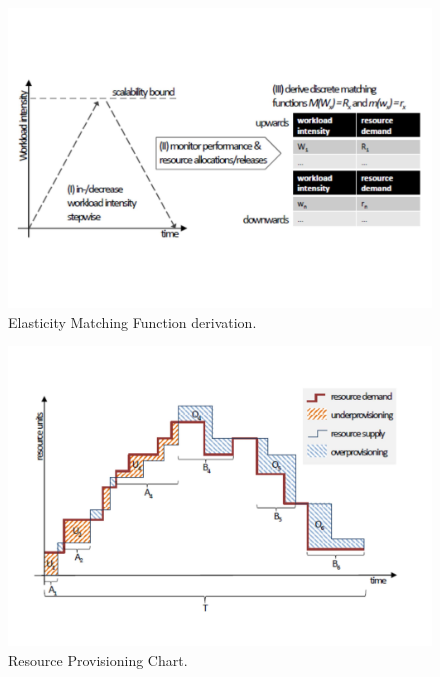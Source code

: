 \begin{figure}
	\vspace{-1.5cm}
	\centering
	\includegraphics[width=\columnwidth]{Images/elasticity_matching_function.pdf}
	\vspace{-2.5cm}
	\caption[Elasticity Matching Function derivation.]{Elasticity Matching Function derivation.}
	\label{fig:elasticity_matching_function}
\end{figure}
\begin{figure}
	\vspace{-0.5cm}
	\centering
	\includegraphics[width=\columnwidth]{Images/elasticity_resource_provisioning_chart.pdf}
	\vspace{-1.5cm}
	\caption[Resource Provisioning Chart.]{Resource Provisioning Chart.}
	\label{fig:elasticity_resource_provisioning_chart}
\end{figure}

